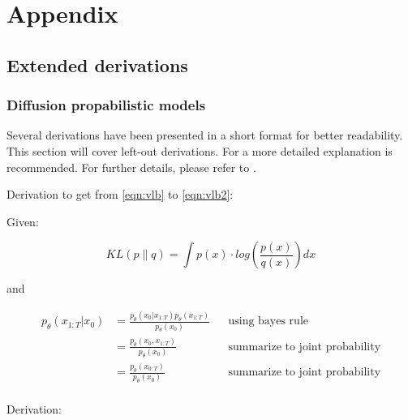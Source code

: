 
\chapter{Appendix} 
\label{ch:Appendix}

\section{Extended derivations}
\label{A:derivations}
\subsection[]{Diffusion propabilistic models}
Several derivations have been presented in a short format for better readability.
This section will cover left-out derivations.
For a more detailed explanation \cite{weng2021WhatAreDiffusion, outlier2022DiffusionModelsPaper} is recommended.
For further details, please refer to \cite{sohl-dickstein2015DeepUnsupervisedLearning, ho2020DenoisingDiffusionProbabilistic}.

Derivation to get from \autoref{eqn:vlb} to \autoref{eqn:vlb2}:

Given:

\begin{equation}
    \label{eqn:kl-divergence_appendix}
    KL(p\parallel q) = \int p(x)\cdot log(\frac{p(x)}{q(x)})dx
\end{equation}

and

\begin{equation}
    \label{eqn:simplify1}
	\begin{align}
    p_\theta(x_{1:T}|x_0) &= \frac{p_\theta(x_0|x_{1:T})p_\theta(x_{1:T})}{p_\theta(x_0)} && \textrm{using bayes rule}\\
	&= \frac{p_\theta(x_0,x_{1:T})}{p_\theta(x_{0})} && \textrm{summarize to joint probability}\\
	&= \frac{p_\theta(x_{0:T})}{p_\theta(x_{0})} && \textrm{summarize to joint probability}\\
\end{align}
\end{equation}

Derivation:

